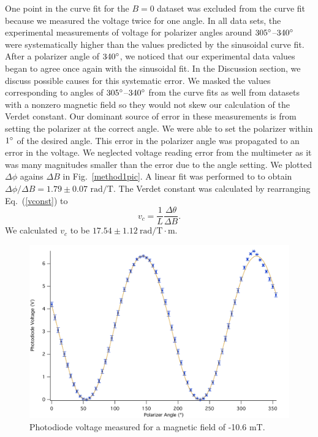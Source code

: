 \documentclass[prb,preprint]{revtex4-1}
\begin{document}
{{One point in the curve fit for the $B=0$ dataset was excluded from the curve fit because we measured the voltage twice for one angle. In all data sets, the experimental measurements of voltage for polarizer angles around $305\degree$--$340\degree$ were systematically higher than the values predicted by the sinusoidal curve fit. 
After a polarizer angle of $340\degree$, we noticed that our experimental data values began to agree once again with the sinusoidal fit.  In the Discussion section, we discuss possible causes for this systematic error. 
We masked the values corresponding to angles of $305\degree$--$340\degree$ from the curve fits as well from datasets with a nonzero magnetic field so they would not skew our calculation of the Verdet constant.
Our dominant source of error in these measurements is from setting the polarizer at the correct angle. We were able to set the polarizer within $1\degree$ of the desired angle. 
This error in the polarizer angle was propagated to an error in the voltage. We neglected voltage reading error from the multimeter as it was many magnitudes smaller than the error due to the angle setting.
We plotted $\Delta \phi$ agains $\Delta B$ in Fig.~\ref{method1pic}. A linear fit was performed to to obtain $\Delta \phi/\Delta B=1.79 \pm 0.07\textrm{~rad/T}$. The Verdet constant was calculated by rearranging Eq.~(\ref{vconst}) to
\begin{equation}
v_c =\frac{1}{L} \frac{\Delta \theta}{\Delta B}. 
\end{equation}
We calculated $v_c$ to be $17.54 \pm 1.12 \mathrm{~rad/T} \cdot \textrm{m}$.
\begin{figure}[h!]
\includegraphics[width = 5.8in]{n1A.pdf}
\caption{\label{neg}Photodiode voltage measured for a magnetic field of -10.6 mT.}

\end{figure}}}
\end{document}
